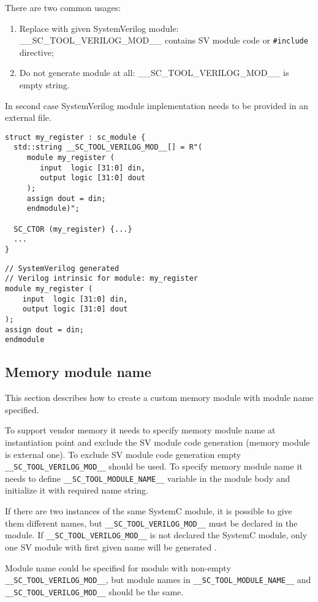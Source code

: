 There are two common usages:
\begin{enumerate}
\item Replace with given SystemVerilog module: \_\_SC\_TOOL\_VERILOG\_MOD\_\_ contains SV module code or {\tt \#include} directive;
\item Do not generate module at all: \_\_SC\_TOOL\_VERILOG\_MOD\_\_ is empty string. 
\end{enumerate}
%
In second case SystemVerilog module implementation needs to be provided in an external file.

\begin{lstlisting}[style=mycpp]
struct my_register : sc_module {
  std::string __SC_TOOL_VERILOG_MOD__[] = R"(
     module my_register (
        input  logic [31:0] din,
        output logic [31:0] dout
     );
     assign dout = din;
     endmodule)";

  SC_CTOR (my_register) {...}
  ...
}
\end{lstlisting}
%
\begin{lstlisting}[style=mycpp]
// SystemVerilog generated
// Verilog intrinsic for module: my_register 
module my_register (
    input  logic [31:0] din,
    output logic [31:0] dout
);
assign dout = din;
endmodule
\end{lstlisting}



\subsection{Memory module name}

This section describes how to create a custom memory module with module name specified. 

To support vendor memory it needs to specify memory module name at instantiation point and exclude the SV module code generation (memory module is external one). To exclude SV module code generation empty {\tt \_\_SC\_TOOL\_VERILOG\_MOD\_\_} should be used. To specify memory module name it needs to define {\tt \_\_SC\_TOOL\_MODULE\_NAME\_\_} variable in the module body and initialize it with required name string.

If there are two instances of the same SystemC module, it is possible to give them different names, but {\tt \_\_SC\_TOOL\_VERILOG\_MOD\_\_} must be declared in the module. If {\tt \_\_SC\_TOOL\_VERILOG\_MOD\_\_} is not declared the SystemC module, only one SV module with first given name will be generated . 

Module name could be specified for module with non-empty {\tt \_\_SC\_TOOL\_VERILOG\_MOD\_\_}, but module names in {\tt \_\_SC\_TOOL\_MODULE\_NAME\_\_} and {\tt \_\_SC\_TOOL\_VERILOG\_MOD\_\_} should be the same.

